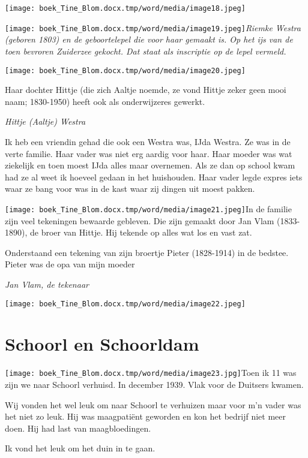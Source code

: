 \documentclass{scrbook}
\begin{document}
\texttt{[image: boek\_Tine\_Blom.docx.tmp/word/media/image18.jpeg]}

\texttt{[image: boek\_Tine\_Blom.docx.tmp/word/media/image19.jpeg]}\textit{Riemke Westra (geboren 1803) en de geboortelepel die voor haar gemaakt is. Op het ijs van de toen bevroren Zuiderzee gekocht. Dat staat als inscriptie op de lepel vermeld.}

\texttt{[image: boek\_Tine\_Blom.docx.tmp/word/media/image20.jpeg]}

Haar dochter Hittje (die zich Aaltje noemde, ze vond Hittje zeker geen mooi naam; 1830-1950) heeft ook als onderwijzeres gewerkt.

\textit{Hittje (Aaltje) Westra} 

Ik heb een vriendin gehad die ook een Westra was, IJda Westra. Ze was in de verte familie. Haar vader was niet erg aardig voor haar. Haar moeder was wat ziekelijk en toen moest IJda alles maar overnemen. Als ze dan op school kwam had ze al weet ik hoeveel gedaan in het huishouden. Haar vader legde expres iets waar ze bang voor was in de kast waar zij dingen uit moest pakken.

\texttt{[image: boek\_Tine\_Blom.docx.tmp/word/media/image21.jpeg]}In de familie zijn veel tekeningen bewaarde gebleven. Die zijn gemaakt door Jan Vlam (1833-1890), de broer van Hittje. Hij tekende op alles wat los en vast zat.

Onderstaand een tekening van zijn broertje Pieter (1828-1914) in de bedstee. Pieter was de opa van mijn moeder

\textit{Jan Vlam, de tekenaar}

\texttt{[image: boek\_Tine\_Blom.docx.tmp/word/media/image22.jpeg]}

\chapter{\label{ref-004}Schoorl en Schoorldam  }

\texttt{[image: boek\_Tine\_Blom.docx.tmp/word/media/image23.jpg]}Toen ik 11 was zijn we naar Schoorl verhuisd. In december 1939. Vlak voor de Duitsers kwamen.

Wij vonden het wel leuk om naar Schoorl te verhuizen maar voor m’n vader was het niet zo leuk. Hij was maagpati\"{e}nt geworden en kon het bedrijf niet meer doen. Hij had last van maagbloedingen. 

Ik vond het leuk om het duin in te gaan.
\end{document}
